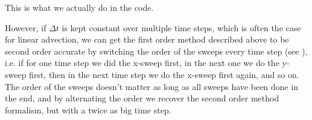 This is what we actually do in the code.

However, if $\Delta t$ is kept constant over multiple time steps, which is
often the case for linear advection, we can get the first order method
described above to be second order accurate by switching the order of the
sweeps every time step (see \cite{leveque_2002}), i.e. if for one time step we
did the x-sweep first, in the next one we do the y-sweep first, then in the
next time step we do the x-sweep first again, and so on. The order of the
sweeps doesn't matter as long as all sweeps have been done in the end, and by
alternating the order we recover the second order method formalism, but with a
twice as big time step.




